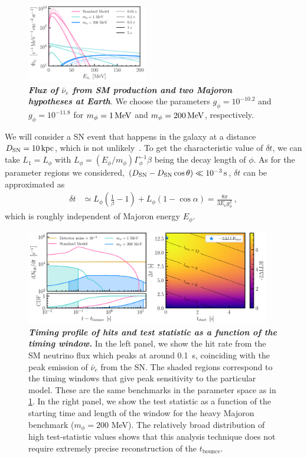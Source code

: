 \documentclass[aps,twocolumn,prl,showpacs,showkeys,preprintnumbers,superscriptaddress,nobibnotes,floatfix,longbibliography,notitlepage,nofootinbib]{revtex4-2}
\begin{document}
\begin{figure}[t!]
    \centering
    \includegraphics[width=0.47\textwidth]{figures/majoran_fluxes.pdf}
    \caption{\textit{\textbf{Flux of $\bar{\nu}_{e}$ from SM production and two Majoron hypotheses at Earth}}.
    We choose the parameters $g_\phi = 10^{-10.2}$ and $g_\phi = 10^{-11.8}$ for $m_\phi = \unit[1]{MeV}$ and $m_\phi = \unit[200]{MeV}$, respectively.
    }
    \label{fig:fluxes}
\end{figure}

We will consider a SN event that happens in the galaxy at a distance $D_{\rm SN}=\unit[10]{kpc}$, which is not unlikely~\cite{Reed:2005en,Rozwadowska:2020nab}. To get the characteristic value of $\delta t$, we can take $L_1 = L_\phi$ with $L_\phi = (E_\phi/m_\phi) \Gamma^{-1}_\phi \beta$ being the decay length of $\phi$.
As for the parameter regions we considered, $(D_{\rm SN} -D_{\rm SN} \cos\theta) \ll \unit[10^{-3}]{s}$, $\delta t$ can be approximated as
\begin{align}
    \delta t &\simeq L_\phi\left(\frac{1}{\beta} -1\right) + L_\phi(1-\cos\alpha) = \frac{8\pi}{3 E_{\nu}g_\phi^2}\,,
    \label{eq:deltat}
\end{align}
which is roughly independent of Majoron energy $E_\phi$.

\begin{figure}[t]
    \centering
    \includegraphics[width=0.95\textwidth]{figures/hits_and_likelihood.pdf}
    \caption{\textbf{\textit{Timing profile of hits and test statistic as a function of the timing window.}}
    In the left panel, we show the hit rate from the SM neutrino flux which peaks at around 0.1~s, coinciding with the peak emission of $\bar{\nu}_{e}$ from the SN. The shaded regions correspond to the timing windows that give peak sensitivity to the particular model. These are the same benchmarks in the parameter space as in \cref{fig:fluxes}.
    In the right panel, we show the test statistic as a function of the starting time and length of the window for the heavy Majoron benchmark ($m_\phi=200$ MeV).
    The relatively broad distribution of high test-statistic values shows that this analysis technique does not require extremely precise reconstruction of the $t_{\mathrm{bounce}}$.
    }
    \label{fig:hits_and_likelihood}
\end{figure}
\end{document}
